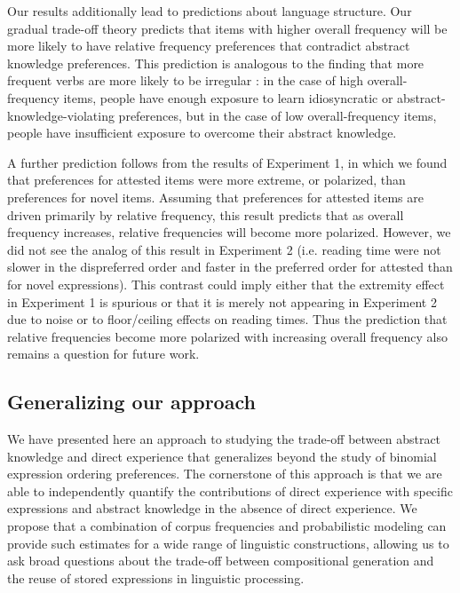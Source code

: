 \documentclass[authoryear]{elsarticle}
\begin{document}
Our results additionally lead to predictions about language structure. Our gradual trade-off theory predicts that items with higher overall frequency will be more likely to have relative frequency preferences that contradict abstract knowledge preferences. This prediction is analogous to the finding that more frequent verbs are more likely to be irregular \citep{Lieberman:2007bl}: in the case of high overall-frequency items, people have enough exposure to learn idiosyncratic or abstract-knowledge-violating preferences, but in the case of low overall-frequency items, people have insufficient exposure to overcome their abstract knowledge.

A further prediction follows from the results of Experiment 1, in which we found that preferences for attested items were more extreme, or polarized, than preferences for novel items. Assuming that preferences for attested items are driven primarily by relative frequency, this result predicts that as overall frequency increases, relative frequencies will become more polarized. However, we did not see the analog of this result in Experiment 2 (i.e. reading time were not slower in the dispreferred order and faster in the preferred order for attested than for novel expressions). This contrast could imply either that the extremity effect in Experiment 1 is spurious or that it is merely not appearing in Experiment 2 due to noise or to floor/ceiling effects on reading times. Thus the prediction that relative frequencies become more polarized with increasing overall frequency also remains a question for future work.



\subsection{Generalizing our approach}
We have presented here an approach to studying the trade-off between abstract knowledge and direct experience that generalizes beyond the study of binomial expression ordering preferences. The cornerstone of this approach is that we are able to independently quantify the contributions of direct experience with specific expressions and abstract knowledge in the absence of direct experience. We propose that a combination of corpus frequencies and probabilistic modeling can provide such estimates for a wide range of linguistic constructions, allowing us to ask broad questions about the trade-off between compositional generation and the reuse of stored expressions in linguistic processing.
\end{document}
